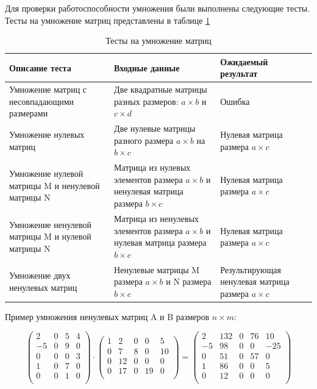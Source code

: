 \documentclass[12pt, a4paper]{article}
\begin{document}
Для проверки работоспособности умножения были выполнены следующие тесты. Тесты на умножение матриц представлены в таблице \ref{tab:my_label1}
\begin{table}[h]
\begin{center}
\caption{Тесты на умножение матриц}
\label{tab:my_label1}
    \centering
    \begin{tabular}{ | m{5cm} | m{5cm}| m{5cm}|} 
  \hline
  Описание теста & Входные данные & Ожидаемый результат \\ 
  \hline
  Умножение матриц с несовпадающими размерами & Две квадратные матрицы разных размеров: $a \times b$ и $c \times d$ & Ошибка\\
  \hline
  Умножение нулевых матриц & Две нулевые матрицы разного размера $a \times b$ на $b \times c$ & Нулевая матрица размера $a \times c$\\
  \hline
  Умножение нулевой матрицы M и ненулевой матрицы N & Матрица из нулевых элементов размера $a \times b$ и ненулевая матрица размера $b \times c$ & Нулевая матрица размера $a \times c$\\
  \hline
  Умножение ненулевой матрицы M и нулевой матрицы N & Матрица из ненулевых элементов размера $a \times b$ и нулевая матрица размера $b \times c$ & Нулевая матрица размера $a \times c$\\
  \hline
  Умножение двух ненулевых матриц & Ненулевые матрицы M размера $a \times b$ и N размера $b \times c$ & Результирующая ненулевая матрица размера $a \times c$\\
  \hline
\end{tabular}
\end{center}
\end{table}

Пример умножения ненулевых матриц A и B размеров $n \times m$: 

\[
\begin{pmatrix}
    2 & 0 & 5 & 4\\
    -5 & 0 & 9 & 0\\ 
    0 & 0 & 0 & 3\\
    1 & 0 & 7 & 0\\
    0 & 0 & 1 & 0\\
\end{pmatrix}
\cdot
\begin{pmatrix}
    1 & 2 & 0 & 0 & 5\\
    0 & 7 & 8 & 0 & 10\\
    0 & 12 & 0 & 0 & 0\\
    0 & 17 & 0 & 19 & 0\\
\end{pmatrix}
=
\begin{pmatrix}
    2 & 132 & 0 & 76 & 10\\
    -5 & 98 & 0 & 0 & -25\\
    0 & 51 & 0 & 57 & 0\\
    1 & 86 & 0 & 0 & 5\\
    0 & 12 & 0 & 0 & 0\\
\end{pmatrix}
\]
\end{document}
